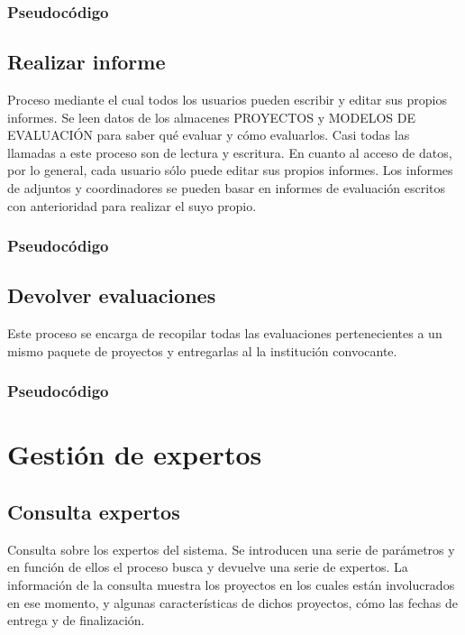 \documentclass[12pt,a4paper,titlepage,spanish,twoside]{book}
\begin{document}
\subsubsection{Pseudocódigo}


\subsection{Realizar informe}
Proceso mediante el cual todos los usuarios pueden escribir y editar sus propios
informes. Se leen datos de los almacenes PROYECTOS y MODELOS DE EVALUACIÓN para 
saber qué evaluar y cómo evaluarlos. Casi todas las llamadas a este proceso son 
de lectura y escritura. En cuanto al acceso de datos, por lo general, cada 
usuario sólo puede editar sus propios informes. Los informes de adjuntos y 
coordinadores se pueden basar en informes de evaluación escritos con 
anterioridad para realizar el suyo propio.

\subsubsection{Pseudocódigo}


\subsection{Devolver evaluaciones}
Este proceso se encarga de recopilar todas las evaluaciones pertenecientes a un 
mismo paquete de proyectos y entregarlas al la institución convocante.

\subsubsection{Pseudocódigo}


\section{Gestión de expertos}

\subsection{Consulta expertos}
Consulta sobre los expertos del sistema. Se introducen una serie de parámetros y
en función de ellos el proceso busca y devuelve una serie de expertos. La 
información de la consulta muestra los proyectos en los cuales están 
involucrados en ese momento, y algunas características de dichos proyectos, cómo
las fechas de entrega y de finalización.
\end{document}
